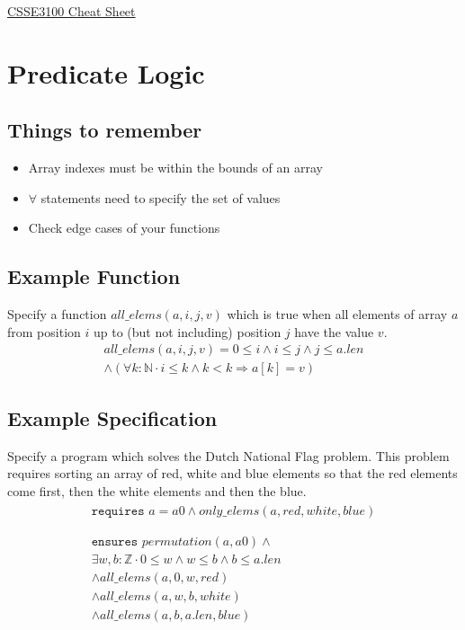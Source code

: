 \documentclass[landscape]{cheat}
\begin{document}
\footnotesize
\begin{multicols*}{3}

\begin{center}
\Large{\underline{CSSE3100 Cheat Sheet}} \\
\end{center}

\section{Predicate Logic}

\subsection{Things to remember}
\begin{itemize}
    \item Array indexes must be within the bounds of an array
    \item $\forall$ statements need to specify the set of values
    \item Check edge cases of your functions
\end{itemize}

\subsection{Example Function}
Specify a function $all\_elems(a, i, j, v)$ which is true when all elements of array $a$ from position $i$ up to (but not including) position $j$ have the value $v$.
\begin{multline*}
all\_elems(a, i, j, v) =
    0 \leq i
    \land i \leq j
    \land j \leq a.len \\
    \land (\forall k : \mathbb{N} \cdot
        i \leq k
        \land k < k
        \Rightarrow a[k] = v
    )
\end{multline*}

\subsection{Example Specification}
Specify a program which solves the Dutch National Flag problem.
This problem requires sorting an array of red, white and blue elements so that the red elements come first, then the white elements and then the blue.
\begin{gather}
\begin{split}
\texttt{requires } a = a0 \land only\_elems(a, red, white, blue) \\
\end{split}
\\
\begin{split}
\texttt{ensures } permutation(a, a0) \land \\
    \exists w, b : \mathbb{Z} \cdot 0 \leq w \land w \leq b \land b \leq a.len \\
    \land all\_elems(a, 0, w, red) \\
    \land all\_elems(a, w, b, white) \\
    \land all\_elems(a, b, a.len, blue)
\end{split}
\end{gather}


\end{multicols*}
\end{document}
